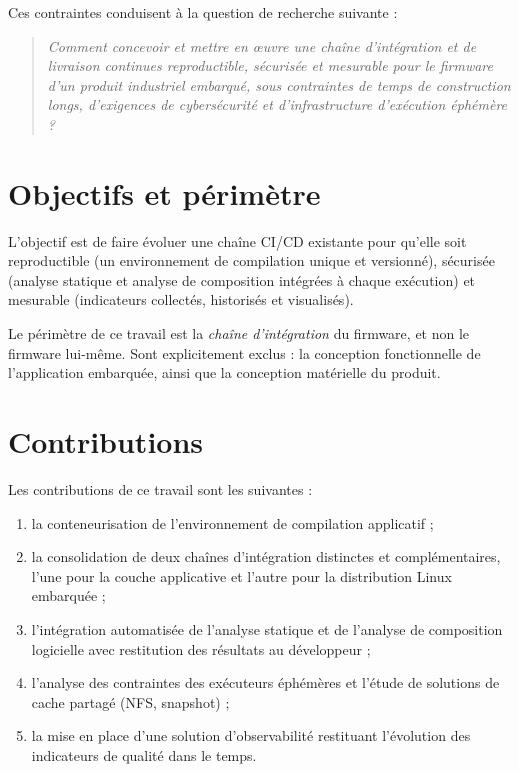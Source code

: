 \medskip
\noindent
Ces contraintes conduisent à la question de recherche suivante :

\begin{quote}
\itshape
Comment concevoir et mettre en œuvre une chaîne d'intégration et de livraison
continues reproductible, sécurisée et mesurable pour le firmware d'un produit
industriel embarqué, sous contraintes de temps de construction longs,
d'exigences de cybersécurité et d'infrastructure d'exécution
éphémère ?
\end{quote}

\section{Objectifs et périmètre}
\label{sec:intro-perimetre}

L'objectif est de faire évoluer une chaîne CI/CD existante pour qu'elle soit
reproductible (un environnement de compilation unique et versionné), sécurisée
(analyse statique et analyse de composition intégrées à chaque exécution) et
mesurable (indicateurs collectés, historisés et visualisés).

Le périmètre de ce travail est la \emph{chaîne d'intégration} du firmware, et
non le firmware lui-même. Sont explicitement exclus : la conception
fonctionnelle de l'application embarquée, ainsi que la conception matérielle du produit.

\section{Contributions}
\label{sec:intro-contributions}

Les contributions de ce travail sont les suivantes :

\begin{enumerate}[nosep]
  \item la conteneurisation de l'environnement de compilation applicatif ;
  \item la consolidation de deux chaînes d'intégration distinctes et
        complémentaires, l'une pour la couche applicative et l'autre pour la
        distribution Linux embarquée ;
  \item l'intégration automatisée de l'analyse statique et de l'analyse de
        composition logicielle avec restitution des résultats au développeur ;
  \item l'analyse des contraintes des exécuteurs éphémères et l'étude de
        solutions de cache partagé (NFS, snapshot) ;
  \item la mise en place d'une solution d'observabilité restituant l'évolution
        des indicateurs de qualité dans le temps.
\end{enumerate}

